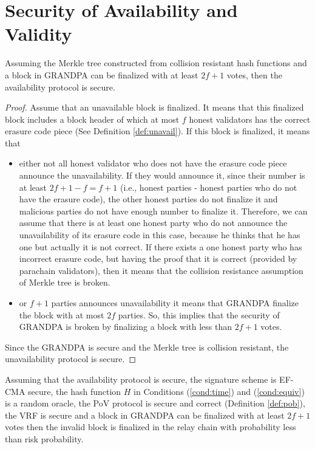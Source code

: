 \section{Security of Availability and Validity}


\begin{theorem}[Availability]
Assuming the Merkle tree constructed from collision resistant hash functions and a block in GRANDPA can be finalized with at least $2f+1$ votes, then the availability protocol is secure.
\end{theorem}

\begin{proof}
Assume that an unavailable block is finalized. It means that this finalized block includes a block header of which at most $f$ honest validators has the correct erasure code piece (See Definition \ref{def:unavail}). If this block is finalized, it means that
\begin{itemize}
    \item either not all honest validator who does not have the erasure code piece announce the unavailability. If they would announce it, since their number is at least $2f+1 - f =f+1$ (i.e., honest parties - honest parties who do not have the erasure code), the other honest parties do not finalize it and malicious parties do not have enough number to finalize it. Therefore, we can assume that there is at least one honest party who do not announce the unavailability of its erasure code in this case, because he thinks that he has one but actually it is not correct. If there exists a one honest party who has incorrect erasure code, but having the proof that it is correct (provided by parachain validators), then it means that the collision resistance assumption of Merkle tree is broken. 
    
    \item or  $f+1$ parties announces unavailability it means that GRANDPA finalize the block with at most $2f$  parties. So, this implies that the security of GRANDPA is broken by finalizing a block with less than $2f+1$ votes.
\end{itemize}

Since the GRANDPA is secure and the Merkle tree is collision resistant, the unavailability protocol is secure.
\end{proof}

\begin{theorem}[Validity]
\label{thm:valid}
Assuming that the availability protocol is secure, the signature scheme is EF-CMA secure, the hash function $H$ in Conditions (\ref{cond:time}) and  (\ref{cond:equiv}) is a random oracle, the PoV protocol is secure and correct (Definition \ref{def:pob}), the VRF is secure and a block in GRANDPA can be finalized with at least $2f+1$ votes then the invalid block is finalized in the relay chain with probability less than risk probability.
\end{theorem}

